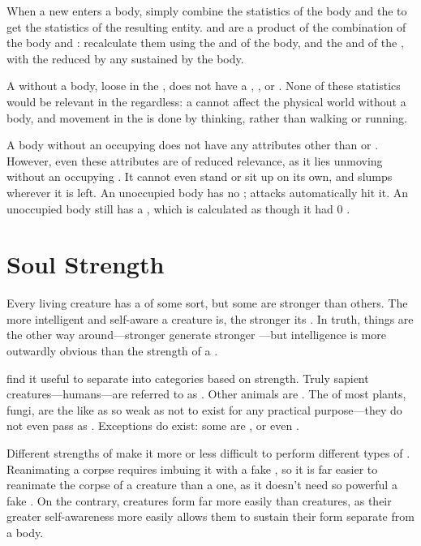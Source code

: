When a new {\mind} enters a body, simply combine the statistics of the body and the {\mind} to get the statistics of the resulting entity.
 and  are a product of the combination of the body and {\mind}: recalculate them using the  and  of the body, and the  and  of the {\mind}, with the  reduced by any {\damage} sustained by the body.

A {\mind} without a body, loose in the {\mentalrealm}, does not have a , , or .
None of these statistics would be relevant in the {\mentalrealm} regardless: a {\mind} cannot affect the physical world without a body, and movement in the {\mentalrealm} is done by thinking, rather than walking or running.

A body without an occupying {\mind} does not have any attributes other than  or .
However, even these attributes are of reduced relevance, as it lies unmoving without an occupying {\mind}.
It cannot even stand or sit up on its own, and slumps wherever it is left.
An unoccupied body has no ; attacks automatically hit it.
An unoccupied body still has a , which is calculated as though it had 0 .

\section{Soul Strength}

Every living creature has a {\soul} of some sort, but some are stronger than others.
The more intelligent and self-aware a creature is, the stronger its {\soul}.
In truth, things are the other way around---stronger {\souls} generate stronger {\minds}---but intelligence is more outwardly obvious than the strength of a {\soul}.

 find it useful to separate {\souls} into categories based on strength.
Truly sapient creatures---humans---are referred to as {\strongsouled}.
Other animals are {\weaksouled}.
The {\souls} of most plants, fungi, are the like as so weak as not to exist for any practical purpose---they do not even pass as {\weaksouled}.
Exceptions do exist: some  are {\weaksouled}, or even {\strongsouled}.

Different strengths of {\soul} make it more or less difficult to perform different types of .
Reanimating a corpse requires imbuing it with a fake {\soul}, so it is far easier to reanimate the corpse of a {\weaksouled} creature than a {\strongsouled} one, as it doesn't need so powerful a fake {\soul}.
On the contrary, {\strongsouled} creatures form {\ghosts} far more easily than {\weaksouled} creatures, as their greater self-awareness more easily allows them to sustain their form separate from a body.

